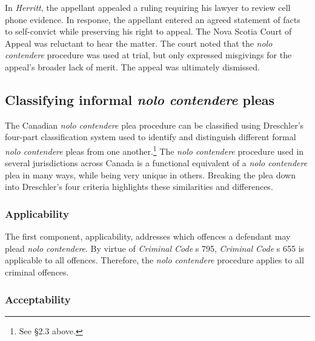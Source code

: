 In \textit{Herritt}, the appellant appealed a ruling requiring his lawyer to review cell phone evidence. In response, the appellant entered an agreed statement of facts to self-convict while preserving his right to appeal. The Nova Scotia Court of Appeal was reluctant to hear the matter. The court noted that the \textit{nolo contendere} procedure was used at trial, but only expressed misgivings for the appeal's broader lack of merit. The appeal was ultimately dismissed.

\subsection{Classifying informal \textit{nolo contendere} pleas}

The Canadian \textit{nolo contendere} plea procedure can be classified using Dreschler's four-part classification system used to identify and distinguish different formal \textit{nolo contendere} pleas from one another.\footnote{See §2.3 above.} The \textit{nolo contendere} procedure used in several jurisdictions across Canada is a functional equivalent of a \textit{nolo contendere} plea in many ways, while being very unique in others. Breaking the plea down into Dreschler's four criteria highlights these similarities and differences.

\subsubsection{Applicability}

The first component, applicability, addresses which offences a defendant may plead \textit{nolo contendere}. By virtue of \textit{Criminal Code} s 795, \textit{Criminal Code} s 655 is applicable to all offences. Therefore, the \textit{nolo contendere} procedure applies to all criminal offences.

\subsubsection{Acceptability}

